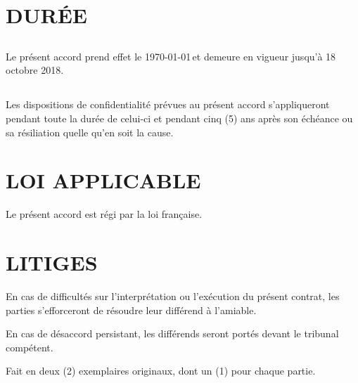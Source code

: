 \documentclass[]{karlito}
\newcommand{\startDateProject}{\today}
\newcommand{\stopDateProject}{18 octobre 2018}
\begin{document}
\chapter{DURÉE}
\section{}Le présent accord prend effet le \startDateProject\,et demeure en vigueur jusqu’à \stopDateProject.

\section{}Les dispositions de confidentialité prévues au présent accord s’appliqueront pendant toute la durée de celui-ci et pendant cinq (5) ans après son échéance ou sa résiliation quelle qu’en soit la cause.




\chapter{LOI APPLICABLE}
Le présent accord est régi par la loi française.


\chapter{LITIGES}
En cas de difficultés sur l'interprétation ou l'exécution du présent contrat, les parties s'efforceront de résoudre leur différend à l'amiable.

En cas de désaccord persistant, les différends seront portés devant le tribunal compétent.

Fait en deux (2) exemplaires originaux, dont un (1) pour chaque partie.

~\newline
~\newline
\end{document}
